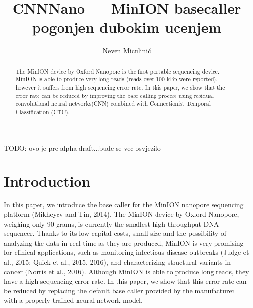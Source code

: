 \documentclass[times, utf8, seminar]{fer}
\begin{document}
\theoremstyle{definition}
\newtheorem{definition}{Definition}[section]

\title{CNNNano --- MinION  basecaller pogonjen dubokim ucenjem}
\author{Neven Miculinić}

\maketitle
\tableofcontents

\begin{sazetak}
TODO: ovo je pre-alpha draft...bude se vec osvjezilo


\end{sazetak}

\begin{abstract}
    The MinION device by Oxford Nanopore is the first portable sequencing device. MinION is able to produce very long reads (reads over 100 kBp were reported), however it suffers from high sequencing error rate. In this paper, we show that the error rate can be reduced by improving the base calling process using residual convolutional neural networks(CNN) combined with Connectionist Temporal Classification (CTC).
\end{abstract}

\chapter{Introduction}

In this paper, we introduce the base caller for the MinION nanopore sequencing platform (Mikheyev and Tin, 2014).
The MinION device by Oxford Nanopore, weighing only 90 grams, is currently the smallest high-throughput DNA sequencer. Thanks to its low capital costs, small size and the possibility of analyzing the data in real time as they are produced, MinION is very promising for clinical applications, such as monitoring infectious disease outbreaks (Judge et al., 2015; Quick et al., 2015, 2016), and characterizing structural variants in cancer (Norris et al., 2016). Although MinION is able to produce long reads, they have a high sequencing error rate. In this paper, we show that this error rate can be reduced by replacing the default base caller provided by the manufacturer with a properly trained neural network model.
\end{document}
